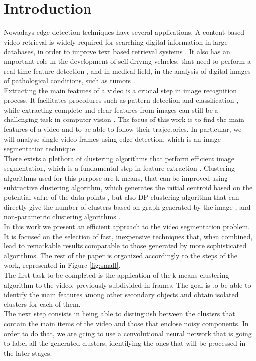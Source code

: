 \documentclass{usiinftr}
\begin{document}
\section{Introduction}
Nowadays edge detection techniques have several applications. A content based video retrieval is widely required for searching digital information in large databases, in order to improve text based retrieval systems \cite{1}. It also has an important role in the development of self-driving vehicles, that need to perform a real-time feature detection \cite{2}, and in medical field, in the analysis of digital images of pathological conditions, such as tumors \cite{3}. \\
Extracting the main features of a video is a crucial step in image recognition process. It facilitates procedures such as pattern detection and classification \cite{4}, while extracting complete and clear features from images can still be a challenging task in computer vision \cite{5}. 
The focus of this work is to find the main features of a video and to be able to follow their trajectories. In particular, we will analyse single video frames using edge detection, which is an image segmentation technique. \\
There exists a  plethora of clustering algorithms that perform efficient image segmentation, which is a fundamental step in feature extraction \cite{6}. Clustering algorithms used for this purpose are k-means, that can be improved using subtractive clustering algorithm, which generates the initial centroid based on the potential value of the data points \cite{7}, but also DP clustering algorithm that can directly give the number of clusters based on graph generated by the image \cite{8}, and non-parametric clustering algorithms \cite{9}. \\
In this work we present an efficient approach to the video segmentation problem. It is focused on the selection of fast, inexpensive techniques that, when combined, lead to remarkable results comparable to those generated by more sophisticated algorithms. 
The rest of the paper is organized accordingly to the steps of the work, represented in Figure \ref{fig:small}. \\
The first task to be completed is the application of the k-means clustering algorithm to the video, previously subdivided in frames. The goal is to be able to identify the main features among other secondary objects and obtain isolated clusters for each of them.\\
The next step consists in being able to distinguish between the clusters that contain the main items of the video and those that enclose  noisy components. In order to do that, we are going to use a convolutional neural network that is going to label all the generated clusters, identifying the ones that will be processed in the later stages. \\
\end{document}
